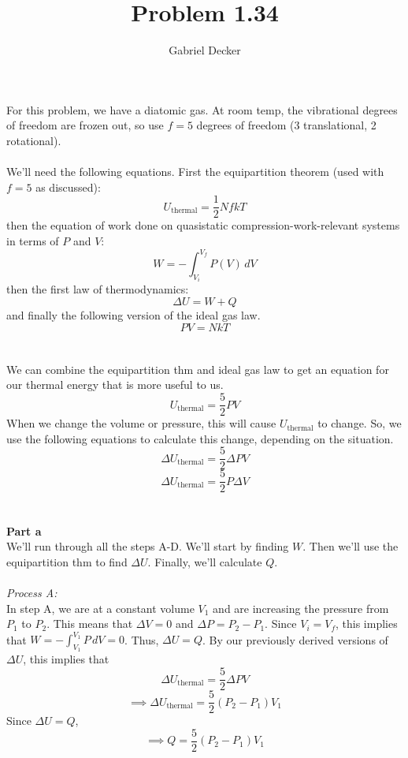 \documentclass[12pt]{article}
\title{Problem 1.34}
\author{Gabriel Decker}
\newcommand{\ds}{\displaystyle}
\begin{document}
\maketitle
\begin{flushleft}

For this problem, we have a diatomic gas.
At room temp, the vibrational degrees of freedom are frozen out, so use $f=5$ degrees of freedom (3 translational, 2 rotational).\\~\\

We'll need the following equations.
    First the equipartition theorem (used with $f=5$ as discussed):
\begin{equation}
    U_\text{thermal}=\frac{1}{2}NfkT
\end{equation}
then the equation of work done on quasistatic compression-work-relevant systems in terms of $P$ and $V$:
\begin{equation}
    W=-\int_{V_i}^{V_f}P(V)\,dV
\end{equation}
then the first law of thermodynamics:
\begin{equation}
    \Delta U=W+Q
\end{equation}
and finally the following version of the ideal gas law.
\begin{equation}
    PV=NkT
\end{equation}\\~\\

We can combine the equipartition thm and ideal gas law to get an equation for our thermal energy that is more useful to us.
$$U_\text{thermal}=\frac{5}{2}PV$$
When we change the volume or pressure, this will cause $U_\text{thermal}$ to change.
So, we use the following equations to calculate this change, depending on the situation.
$$\Delta U_\text{thermal}=\frac{5}{2}\Delta PV$$
$$\Delta U_\text{thermal}=\frac{5}{2}P\Delta V$$\\~\\

\textbf{Part a}\\
We'll run through all the steps A-D. We'll start by finding $W$.
Then we'll use the equipartition thm to find $\Delta U$.
Finally, we'll calculate $Q$.\\~\\

\textit{Process A:}\\
In step A, we are at a constant volume $V_1$ and are increasing the pressure from $P_1$ to $P_2$.
This means that $\Delta V=0$ and $\Delta P=P_2-P_1$.
Since $V_i=V_f$, this implies that $\ds W=-\int_{V_1}^{V_1}P\,dV=0$.
Thus, $\Delta U=Q$.
By our previously derived versions of $\Delta U$, this implies that
$$\Delta U_\text{thermal}=\frac{5}{2}\Delta PV$$
$$\implies\Delta U_\text{thermal}=\frac{5}{2}(P_2-P_1)V_1$$
Since $\Delta U=Q$,
$$\implies Q=\frac{5}{2}(P_2-P_1)V_1$$\\~\\


\end{flushleft}
\end{document}
